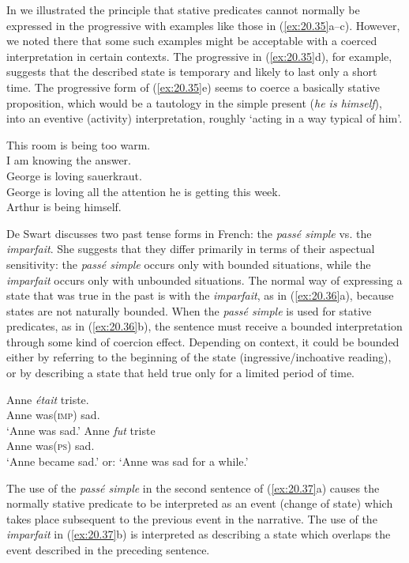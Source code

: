 In  we illustrated the principle that stative predicates cannot normally be expressed in the progressive with examples like those in (\ref{ex:20.35}a--c). However, we noted there that some such examples might be acceptable with a coerced interpretation in certain contexts. The progressive in (\ref{ex:20.35}d), for example, suggests that the described state is temporary and likely to last only a short time. The progressive form of (\ref{ex:20.35}e) seems to coerce a basically stative proposition, which would be a tautology in the simple present (\textit{he is himself}), into an eventive (activity) interpretation, roughly ‘acting in a way typical of him’.


\ea \label{ex:20.35}
\ea  *This room is being too warm.\\
\ex *I am knowing the answer.\\
\ex *George is loving sauerkraut.\\
\ex George is loving all the attention he is getting this week.\\
\ex Arthur is being himself.
                       \z
\z


De Swart discusses two past tense forms in French: the \textit{passé simple} vs. the \textit{imparfait}. She suggests that they differ primarily in terms of their aspectual sensitivity: the \textit{passé simple} occurs only with bounded situations, while the \textit{imparfait} occurs only with unbounded situations. The normal way of expressing a state that was true in the past is with the \textit{imparfait}, as in (\ref{ex:20.36}a), because states are not naturally bounded. When the \textit{passé simple} is used for stative predicates, as in (\ref{ex:20.36}b), the sentence must receive a bounded interpretation through some kind of coercion effect. Depending on context, it could be bounded either by referring to the beginning of the state (ingressive/inchoative reading), or by describing a state that held true only for a limited period of time.


\ea \label{ex:20.36}
\ea  \gll  Anne  \textit{était}  triste.\\
Anne  was(\textsc{imp})  sad.\\
\glt ‘Anne was sad.’
\ex \gll Anne  \textit{fut}  triste\\
Anne  was(\textsc{ps})  sad.\\
\glt ‘Anne became sad.’ or: ‘Anne was sad for a while.’
\z \z


The use of the \textit{passé simple} in the second sentence of (\ref{ex:20.37}a) causes the normally stative predicate to be interpreted as an event (change of state) which takes place subsequent to the previous event in the narrative. The use of the \textit{imparfait} in (\ref{ex:20.37}b) is interpreted as describing a state which overlaps the event described in the preceding sentence.


